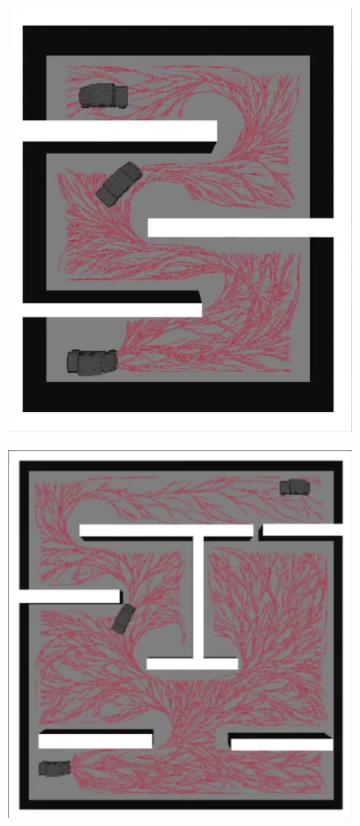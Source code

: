 \documentclass[../thesis.tex]{subfiles}
\begin{document}
\begin{figure}[t]
    	\centering
    	\begin{subfigure}[b]{0.3\linewidth}
    	 \includegraphics[width=\columnwidth]{./RRTPlanner/fig/rrt-sim-maze1.png}
           	\subcaption{}
           	\label{fig:rrt-sim-maze1}
    	\end{subfigure}
    	\begin{subfigure}[b]{0.3\linewidth}
    	 \includegraphics[width=\columnwidth]{./RRTPlanner/fig/rrt-sim-maze2.png}

\end{subfigure}
\end{figure}
\end{document}
